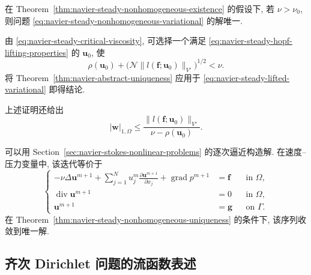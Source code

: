 \setcounter{statement}{3}
\begin{Theorem}\label{thm:navier-steady-nonhomogeneous-uniqueness}
在 Theorem~\ref{thm:navier-steady-nonhomogeneous-existence} 的假设下,
若 $\nu>\nu_0$, 则问题
\eqref{eq:navier-steady-nonhomogeneous-variational} 的解唯一.
\end{Theorem}
\begin{Proof}
由 \eqref{eq:navier-steady-critical-viscosity}, 可选择一个满足
\eqref{eq:navier-steady-hopf-lifting-properties} 的 $\mathbf u_0$, 使
\[
\rho(\mathbf u_0)
+\bigl(\mathcal N\|l(\mathbf f;\mathbf u_0)\|_{V'}\bigr)^{1/2}<\nu.
\]
将 Theorem~\ref{thm:navier-abstract-uniqueness} 应用于
\eqref{eq:navier-steady-lifted-variational} 即得结论.
\end{Proof}

\setcounter{statement}{0}
\begin{Remark}\label{rem:navier-steady-lifted-bound}
上述证明还给出
\[
|\mathbf w|_{1,\Omega}
\leq\frac{\|l(\mathbf f;\mathbf u_0)\|_{V'}}
{\nu-\rho(\mathbf u_0)}.
\]
\end{Remark}

\setcounter{statement}{1}
\begin{Remark}\label{rem:navier-steady-oseen-iteration}
可以用 Section~\ref{sec:navier-stokes-nonlinear-problems} 的逐次逼近构造解.
在速度--压力变量中, 该迭代等价于
\begin{equation}\label{eq:navier-steady-oseen-iteration}
\left\{
\begin{aligned}
-\nu\Delta\mathbf u^{m+1}
+\sum_{j=1}^{N}u_j^m
\frac{\partial\mathbf u^{m+1}}{\partial x_j}
+\operatorname{grad}p^{m+1}
&=\mathbf f&&\text{in }\Omega,\\
\operatorname{div}\mathbf u^{m+1}&=0&&\text{in }\Omega,\\
\mathbf u^{m+1}&=\mathbf g&&\text{on }\Gamma.
\end{aligned}
\right.
\end{equation}
在 Theorem~\ref{thm:navier-steady-nonhomogeneous-uniqueness} 的条件下,
该序列收敛到唯一解.
\end{Remark}

\subsection{齐次 Dirichlet 问题的流函数表述}
\label{subsec:navier-steady-stream-function}

